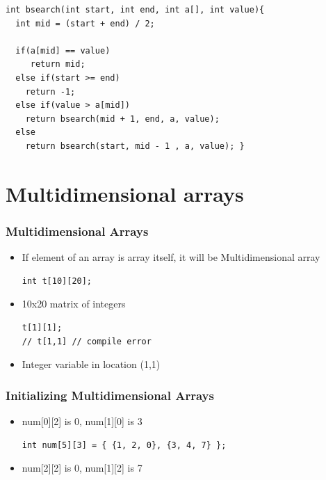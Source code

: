 \documentclass{../c-lecture}
\begin{document}
\begin{frame}[fragile]
  \scriptsize
  \begin{verbatim}
int bsearch(int start, int end, int a[], int value){
  int mid = (start + end) / 2;

  if(a[mid] == value)
     return mid;
  else if(start >= end)
    return -1;
  else if(value > a[mid])
    return bsearch(mid + 1, end, a, value);
  else
    return bsearch(start, mid - 1 , a, value); }
  \end{verbatim}
\end{frame}

\section{Multidimensional arrays}

\begin{frame}[fragile]
  \frametitle{Multidimensional Arrays}
  \begin{itemize}
    \item
      If element of an array is array itself, it will be Multidimensional array

    \begin{verbatim}
int t[10][20];
    \end{verbatim}
    \item 10x20 matrix of integers
    \begin{verbatim}
t[1][1];
// t[1,1] // compile error
    \end{verbatim}
    \item Integer variable in location (1,1)
  \end{itemize}
\end{frame}

\begin{frame}[fragile]
  \frametitle{Initializing Multidimensional Arrays}
  \begin{itemize}
    \begin{verbatim}
int num[2][3] = {1, 2, 0, 3, 4, 7};
int num[2][3] = { {1, 2, 0}, {3, 4, 7} };
    \end{verbatim}
    \item num[0][2] is 0, num[1][0] is 3
    \begin{verbatim}
int num[5][3] = { {1, 2, 0}, {3, 4, 7} };
    \end{verbatim}
    \item num[2][2] is 0, num[1][2] is 7
  \end{itemize}
\end{frame}
\end{document}
